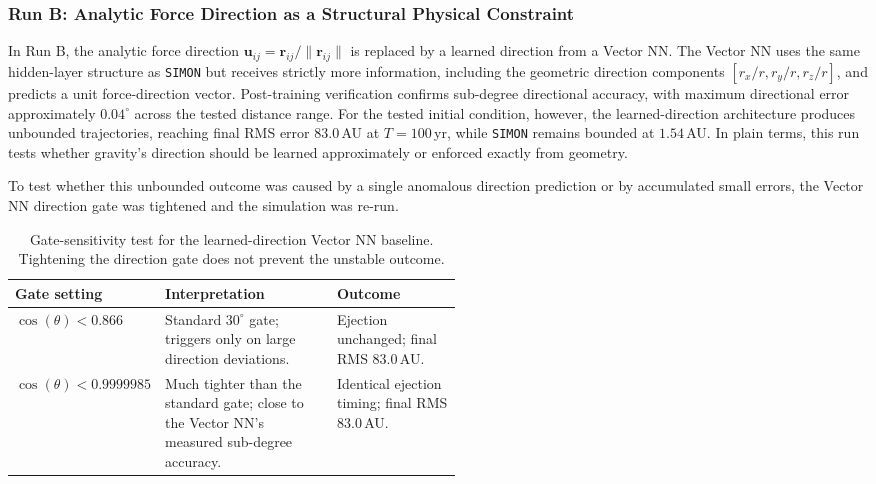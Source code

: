 \documentclass[12pt]{article}
\begin{document}
\subsubsection{Run B: Analytic Force Direction as a Structural Physical Constraint}
\label{sec:run_b}

In Run B, the analytic force direction $\mathbf{u}_{ij} = \mathbf{r}_{ij}/\|\mathbf{r}_{ij}\|$ is replaced by a learned direction from a Vector NN. The Vector NN uses the same hidden-layer structure as \texttt{SIMON} but receives strictly more information, including the geometric direction components $[r_x/r, r_y/r, r_z/r]$, and predicts a unit force-direction vector. Post-training verification confirms sub-degree directional accuracy, with maximum directional error approximately $0.04^\circ$ across the tested distance range. For the tested initial condition, however, the learned-direction architecture produces unbounded trajectories, reaching final RMS error $83.0$\,AU at $T = 100$\,yr, while \texttt{SIMON} remains bounded at $1.54$\,AU. In plain terms, this run tests whether gravity's direction should be learned approximately or enforced exactly from geometry.

To test whether this unbounded outcome was caused by a single anomalous direction prediction or by accumulated small errors, the Vector NN direction gate was tightened and the simulation was re-run.

\begin{table}[H]
\centering
\caption{Gate-sensitivity test for the learned-direction Vector NN baseline. Tightening the direction gate does not prevent the unstable outcome.}
\label{tab:vector_gate_sensitivity}
\begin{tabularx}{\linewidth}{
    >{\raggedright\arraybackslash}p{0.24\linewidth}
    >{\raggedright\arraybackslash}X
    >{\raggedright\arraybackslash}p{0.28\linewidth}
}
\toprule
\textbf{Gate setting} & \textbf{Interpretation} & \textbf{Outcome} \\
\midrule
$\cos(\theta) < 0.866$
&
Standard $30^\circ$ gate; triggers only on large direction deviations.
&
Ejection unchanged; final RMS $83.0$\,AU.
\\
\addlinespace
$\cos(\theta) < 0.9999985$
&
Much tighter than the standard gate; close to the Vector NN's measured sub-degree accuracy.
&
Identical ejection timing; final RMS $83.0$\,AU.
\\
\bottomrule
\end{tabularx}
\end{table}
\end{document}
